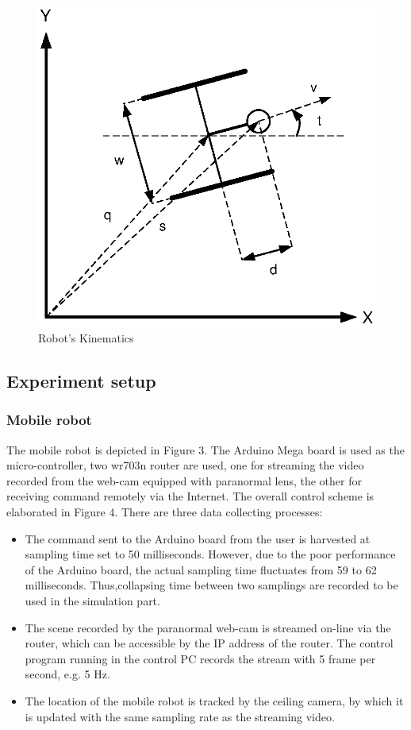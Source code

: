 \documentclass[times]{asjcauth}
\begin{document}
\begin{figure}
\centering
\includegraphics[width=.7\columnwidth]{Robot_kinematics.eps}
\caption{Robot's Kinematics}
\end{figure}

\subsection{Experiment setup}
\subsubsection{Mobile robot}

The mobile robot is depicted in Figure 3. The Arduino Mega board is used as the micro-controller, two wr703n router are used, one for streaming the video recorded from the web-cam equipped with paranormal lens, the other for receiving command remotely via the Internet. The overall control scheme is elaborated in Figure 4. There are three data collecting processes:
\begin{itemize}
\item The command sent to the Arduino board from the user is harvested at sampling time set to 50 milliseconds. However, due to the poor performance of the Arduino board, the actual sampling time fluctuates from 59 to 62 milliseconds. Thus,collapsing time between two samplings are recorded to be used in the simulation part.
\item The scene recorded by the paranormal web-cam is streamed on-line via the router, which can be accessible by the IP address of the router. The control program running in the control PC records the stream with 5 frame per second, e.g. 5 Hz.
\item The location of the mobile robot is tracked by the ceiling camera, by which it is updated with the same sampling rate as the streaming video.   
\end{itemize}
\end{document}
